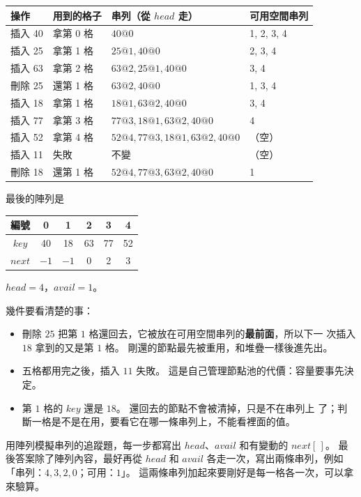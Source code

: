 \begin{center}
\begin{tabular}{llll}
\toprule
操作 & 用到的格子 & 串列（從 $\mathit{head}$ 走） & 可用空間串列 \\
\midrule
插入 40 & 拿第 0 格 & $40@0$ & 1, 2, 3, 4 \\
插入 25 & 拿第 1 格 & $25@1, 40@0$ & 2, 3, 4 \\
插入 63 & 拿第 2 格 & $63@2, 25@1, 40@0$ & 3, 4 \\
刪除 25 & 還第 1 格 & $63@2, 40@0$ & 1, 3, 4 \\
插入 18 & 拿第 1 格 & $18@1, 63@2, 40@0$ & 3, 4 \\
插入 77 & 拿第 3 格 & $77@3, 18@1, 63@2, 40@0$ & 4 \\
插入 52 & 拿第 4 格 & $52@4, 77@3, 18@1, 63@2, 40@0$ & （空） \\
插入 11 & 失敗 & 不變 & （空） \\
刪除 18 & 還第 1 格 & $52@4, 77@3, 63@2, 40@0$ & 1 \\
\bottomrule
\end{tabular}
\end{center}

\begin{center}
最後的陣列是\quad
\begin{tabular}{cccccc}
\toprule
編號 & 0 & 1 & 2 & 3 & 4 \\
\midrule
$\mathit{key}$ & 40 & 18 & 63 & 77 & 52 \\
$\mathit{next}$ & $-1$ & $-1$ & 0 & 2 & 3 \\
\bottomrule
\end{tabular}
\qquad $\mathit{head} = 4$，$\mathit{avail} = 1$。
\end{center}

幾件要看清楚的事：

\begin{itemize}
\item 刪除 $25$ 把第 $1$ 格還回去，它被放在可用空間串列的\textbf{最前面}，所以下一
次插入 $18$ 拿到的又是第 $1$ 格。 剛還的節點最先被重用，和堆疊一樣後進先出。
\item 五格都用完之後，插入 $11$ 失敗。 這是自己管理節點池的代價：容量要事先決定。
\item 第 $1$ 格的 $\mathit{key}$ 還是 $18$。 還回去的節點不會被清掉，只是不在串列上
了；判斷一格是不是在用，要看它在哪一條串列上，不能看裡面的值。
\end{itemize}

\begin{examnote}
用陣列模擬串列的追蹤題，每一步都寫出 $\mathit{head}$、$\mathit{avail}$ 和有變動的
$\mathit{next}[\,]$。 最後答案除了陣列內容，最好再從 $\mathit{head}$ 和
$\mathit{avail}$ 各走一次，寫出兩條串列，例如「串列：$4, 3, 2, 0$；可用：$1$」。
這兩條串列加起來要剛好是每一格各一次，可以拿來驗算。
\end{examnote}

